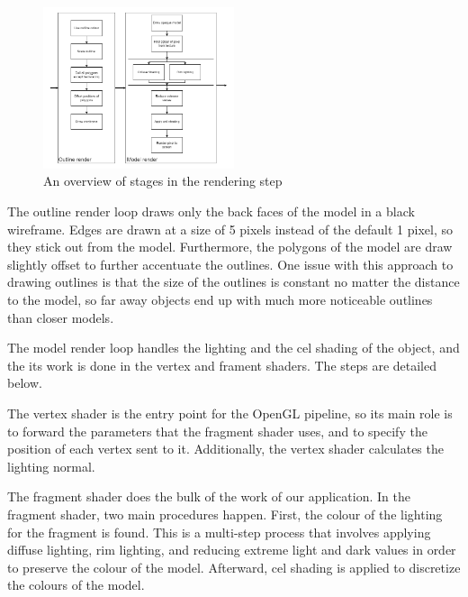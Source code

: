 \begin{figure}[h]
    \centering
    \includegraphics[width=0.5\textwidth]{img/rendering-overview.png}
    \caption{An overview of stages in the rendering step}
    \label{fig-render-overview}
\end{figure}

The outline render loop draws only the back faces of the model in a black wireframe. Edges
are drawn at a size of 5 pixels instead of the default 1 pixel, so they stick out from the model.
Furthermore, the polygons of the model are draw slightly offset to further accentuate the outlines.
One issue with this approach to drawing outlines is that the size of the outlines is constant no 
matter the distance to the model, so far away objects end up with much more noticeable outlines
than closer models.


The model render loop handles the lighting and the cel shading of the object, and the its work is
done in the vertex and frament shaders. The steps are detailed below.

The vertex shader is the entry point for the OpenGL pipeline, so its main role is to forward the 
parameters that the fragment shader uses, and to specify the position of each vertex sent to it. 
Additionally, the vertex shader calculates the lighting normal.

The fragment shader does the bulk of the work of our application. In the fragment shader, two main
procedures happen. First, the colour of the lighting for the fragment is found. This is a multi-step
process that involves applying diffuse lighting, rim lighting, and reducing extreme light and dark 
values in order to preserve the colour of the model. Afterward, cel shading is applied to discretize
the colours of the model. 


